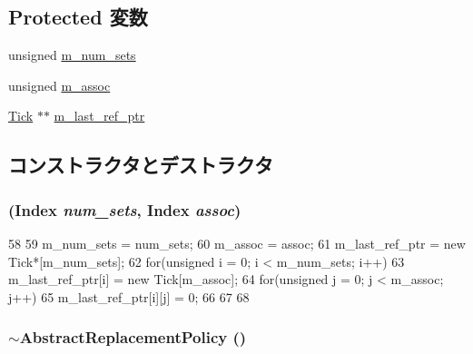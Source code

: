 \subsection*{Protected 変数}
\begin{DoxyCompactItemize}
\item 
unsigned \hyperlink{classAbstractReplacementPolicy_a02f70f06d6633b7809066c8bd63a6a3e}{m\_\-num\_\-sets}
\item 
unsigned \hyperlink{classAbstractReplacementPolicy_a8ad9d20c98fe601aa72716ddc5b97f2d}{m\_\-assoc}
\item 
\hyperlink{base_2types_8hh_a5c8ed81b7d238c9083e1037ba6d61643}{Tick} $\ast$$\ast$ \hyperlink{classAbstractReplacementPolicy_a24a457a2854b5f62404b18272f5a3da3}{m\_\-last\_\-ref\_\-ptr}
\end{DoxyCompactItemize}


\subsection{コンストラクタとデストラクタ}
\hypertarget{classAbstractReplacementPolicy_a5a97664620a36d345954e66ae7cdbfb0}{
\subsubsection[{AbstractReplacementPolicy}]{ ({\bf Index} {\em num\_\-sets}, \/  {\bf Index} {\em assoc})}}
\label{classAbstractReplacementPolicy_a5a97664620a36d345954e66ae7cdbfb0}



\begin{DoxyCode}
58 {
59     m_num_sets = num_sets;
60     m_assoc = assoc;
61     m_last_ref_ptr = new Tick*[m_num_sets];
62     for(unsigned i = 0; i < m_num_sets; i++){
63         m_last_ref_ptr[i] = new Tick[m_assoc];
64         for(unsigned j = 0; j < m_assoc; j++){
65             m_last_ref_ptr[i][j] = 0;
66         }
67     }
68 }
\end{DoxyCode}
\hypertarget{classAbstractReplacementPolicy_ae72a8485ba00ae76c66dd66ddebb07ff}{
\subsubsection[{$\sim$AbstractReplacementPolicy}]{\setlength{\rightskip}{0pt plus 5cm}$\sim${\bf AbstractReplacementPolicy} ()}}
\label{classAbstractReplacementPolicy_ae72a8485ba00ae76c66dd66ddebb07ff}




